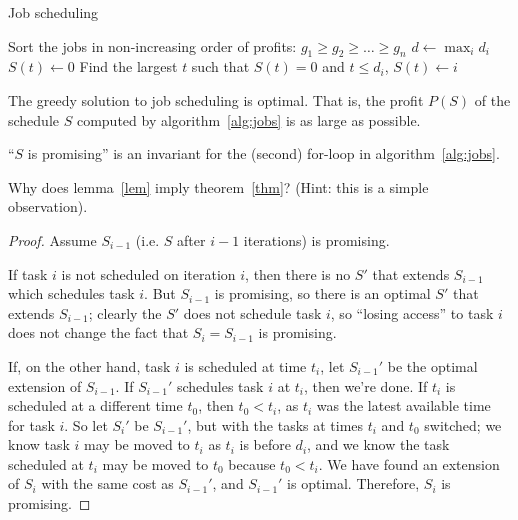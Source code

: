 \documentclass{article}
\newenvironment{thm}[1]
	{\renewcommand\theinnerthm{#1}\innerthm}
	{\endinnerthm}
\newenvironment{lem}[1]
	{\renewcommand\theinnerlem{#1}\innerlem}
	{\endinnerlem}
\newenvironment{prb}[1]
	{\renewcommand\theinnerprb{#1}\innerprb}
	{\endinnerprb}
\begin{document}
\begin{algorithm}
\caption{Job scheduling}%
\label{alg:jobs}%
\begin{algorithmic}[1]
\STATE Sort the jobs in non-increasing order of profits:
  $g_1\geq g_2\geq\ldots\geq g_n$ 
\STATE $d\longleftarrow\max_id_i$ 
     \STATE $S(t)\longleftarrow 0$ 
\ENDFOR
{} 
     \STATE Find the largest $t$ such that $S(t)=0$ and $t\leq d_i$,
            $S(t)\longleftarrow i$
\ENDFOR
\end{algorithmic}
\end{algorithm}

\begin{thm}{2.18}\label{thm}
The greedy solution to job scheduling is optimal. That is, the profit $P(S)$ of the schedule $S$ computed
by algorithm~\ref{alg:jobs} is as large as possible.
\end{thm}

\begin{lem}{2.19}\label{lem}
``$S$ is promising'' is an invariant for the (second) for-loop
in algorithm~\ref{alg:jobs}.   
\end{lem}

\begin{prb}{2.21}
Why does lemma~\ref{lem} imply theorem~\ref{thm}?
(Hint: this is a simple observation). 
\end{prb}

\begin{proof}
Assume $S_{i-1}$ (i.e. $S$ after $i-1$ iterations) is promising.

 If task $i$ is not 
scheduled on iteration $i$, then there is no $S'$ that extends 
$S_{i-1}$ which schedules task $i$. But $S_{i-1}$ is promising, so 
there is an optimal $S'$ that extends $S_{i-1}$; clearly the $S'$ does
not schedule task $i$, so ``losing access'' to task $i$ does not 
change the fact that $S_i=S_{i-1}$ is promising.

 If, on the other hand, task $i$ is scheduled at
time $t_i$, let $S_{i-1}'$ be the optimal extension of $S_{i-1}$. If
$S_{i-1}'$ schedules task $i$ at $t_i$, then we're done. If $t_i$ is
scheduled at a different time $t_0$, then $t_0<t_i$, as $t_i$ was the
latest available time for task $i$. So let $S_i'$ be $S_{i-1}'$, but
with the tasks at times $t_i$ and $t_0$ switched; we know task $i$ may
be moved to $t_i$ as $t_i$ is before $d_i$, and we know the task
scheduled at $t_i$ may be moved to $t_0$ because $t_0<t_i$.
We have found an extension of $S_i$ with the same cost as $S_{i-1}'$,
and $S_{i-1}'$ is optimal. Therefore, $S_i$ is promising.
\end{proof}
\end{document}
